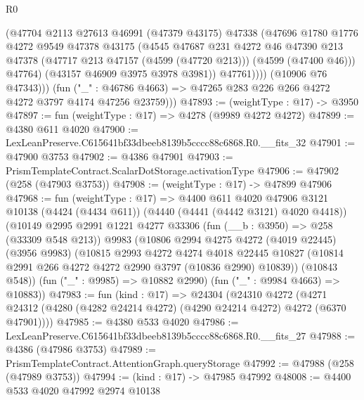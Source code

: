 \begin{lexlean}{R0}
\begin{coremodule}
                    (@47704
                      @2113
                      @27613
                      @46991
                      (@47379 @43175)
                      @47338
                      (@47696
                        @1780
                        @1776
                        @4272
                        @9549
                        @47378
                        @43175
                        (@4545
                          @47687
                          @231
                          @4272
                          @46
                          @47390
                          @213
                          @47378
                          (@47717 @213 @47157 (@4599 (@47720 @213)))
                          (@4599 (@47400 @46)))
                        @47764)
                      (@43157 @46909 @3975 @3978 @3981))
                    @47761))))
            (@10906 @76 @47343)))
        (fun ("_" : @46786 @4663) => @47265 @283 @226 @266 @4272 @4272 @3797 @4174 @47256 @23759)))
@47893 := (weightType : @17) -> @3950
@47897 := fun (weightType : @17) => @4278 (@9989 @4272 @4272)
@47899 := @4380 @611 @4020
@47900 := LexLeanPreserve.C615641bf33dbeeb8139b5cccc88c6868.R0.__fits_32
@47901 := @47900 @3753
@47902 := @4386 @47901
@47903 := PrismTemplateContract.ScalarDotStorage.activationType
@47906 := @47902 (@258 (@47903 @3753))
@47908 := (weightType : @17) -> @47899 @47906
@47968 := fun (weightType : @17) =>
  @4400
    @611
    @4020
    @47906
    @3121
    @10138
    (@4424 (@4434 @611))
    (@4440 (@4441 (@4442 @3121) @4020 @4418))
    (@10149
      @2995
      @2991
      @1221
      @4277
      @33306
      (fun (__b : @3950) => @258 (@33309 @548 @213))
      @9983
      (@10806
        @2994
        @4275
        @4272
        (@4019 @22445)
        (@3956 @9983)
        (@10815
          @2993
          @4272
          @4274
          @4018
          @22445
          @10827
          (@10814 @2991 @266 @4272 @4272 @2990 @3797 (@10836 @2990) @10839))
        (@10843 @548))
      (fun ("_" : @9985) => @10882 @2990)
      (fun ("_" : @9984 @4663) => @10883))
@47983 := fun (kind : @17) =>
  @24304
    (@24310
      @4272
      (@4271 @24312 (@4280 (@4282 @24214 @4272) (@4290 @24214 @4272) @4272 (@6370 @47901))))
@47985 := @4380 @533 @4020
@47986 := LexLeanPreserve.C615641bf33dbeeb8139b5cccc88c6868.R0.__fits_27
@47988 := @4386 (@47986 @3753)
@47989 := PrismTemplateContract.AttentionGraph.queryStorage
@47992 := @47988 (@258 (@47989 @3753))
@47994 := (kind : @17) -> @47985 @47992
@48008 := @4400
    @533
    @4020
    @47992
    @2974
    @10138

\end{coremodule}
\end{lexlean}
